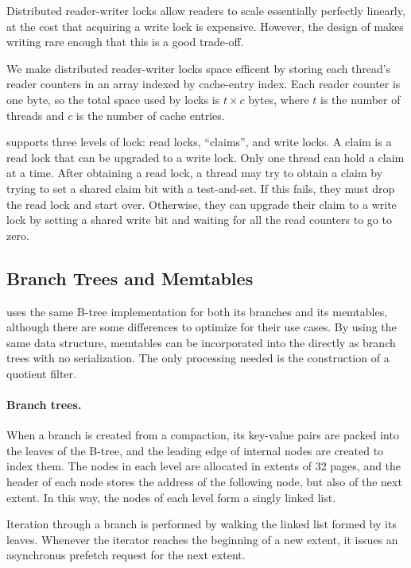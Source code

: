 Distributed reader-writer locks allow readers to scale essentially
perfectly linearly, at the cost that acquiring a write lock is
expensive.  However, the design of \sysname makes writing rare enough
that this is a good trade-off.

We make distributed reader-writer locks space efficent by storing each
thread's reader counters in an array indexed by cache-entry index.
Each reader counter is one byte, so the total space used by locks
is $t\times c$ bytes, where $t$ is the number of threads and $c$ is the
number of cache entries.

\sysname supports three levels of lock: read locks, ``claims'', and
write locks.  A claim is a read lock that can be upgraded to a write
lock.  Only one thread can hold a claim at a time.  After obtaining a
read lock, a thread may try to obtain a claim by trying to set a
shared claim bit with a test-and-set. If this fails, they must drop
the read lock and start over.  Otherwise, they can upgrade their claim
to a write lock by setting a shared write bit and waiting for all the
read counters to go to zero.

\subsection{Branch Trees and Memtables}
\sysname uses the same B-tree implementation for both its branches and its
memtables, although there are some differences to optimize for their use cases.
By using the same data structure, memtables can be incorporated into the 
\datastruct directly as branch trees with no serialization. The only processing
needed is the construction of a quotient filter.

\paragraph{Branch trees.}
When a branch is created from a compaction, its key-value pairs are packed into
the leaves of the B-tree, and the leading edge of internal nodes are created to
index them. The nodes in each level are allocated in extents of 32 pages, and
the header of each node stores the address of the following node, but also of
the next extent. In this way, the nodes of each level form a singly linked list.

Iteration through a branch is performed by walking the linked list
formed by its leaves.  Whenever the iterator reaches the beginning of
a new extent, it issues an asynchronus prefetch request for the next
extent.


